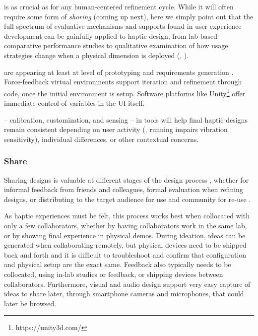 is as crucial as for any human-centered refinement cycle. While it will often require some form of \textit{sharing} (coming up next), here we simply point out that the full spectrum of evaluative mechanisms and supports found in user experience development can be gainfully applied to haptic design, from lab-based comparative performance studies to qualitative examination of how usage strategies change when a physical dimension is deployed (\eg, \cite{minaker:2016:EH:handson}).

 are appearing at least at level of prototyping and requirements generation \cite{SchneiderAsiaHaptics2014,Seifi2014}. 
Force-feedback virtual environments support iteration and refinement through code, once the initial environment is setup.
Software platforms like Unity\footnote{https://unity3d.com/} offer immediate control of variables in the UI itself.

 -- calibration, customization, and sensing -- in tools will help final haptic designs remain consistent depending on user activity (\eg, running impairs vibration sensitivity), individual differences, or other contextual concerns.

%
%
\subsubsection{Share} 
	\label{sec:make_DP_share}
Sharing designs is valuable at different stages of the design process \cite{Kulkarni2012}, whether for informal feedback from friends and colleagues, formal evaluation when refining designs, or distributing to the target audience for use and community for re-use \cite{Shneiderman2007}.

As haptic experiences must be felt, this process works best when collocated with only a few collaborators, whether by having collaborators work in the same lab, or by showing final experience in physical demos.
During ideation, ideas can be generated when collaborating remotely, but physical devices need to be shipped back and forth and it is difficult to troubleshoot and confirm that configuration and physical setup are the exact same.
Feedback also typically needs to be collocated, using in-lab studies or feedback, or shipping devices between collaborators.
Furthermore, visual and audio design support very easy capture of ideas to share later, through smartphone cameras and microphones, that could later be browsed.

